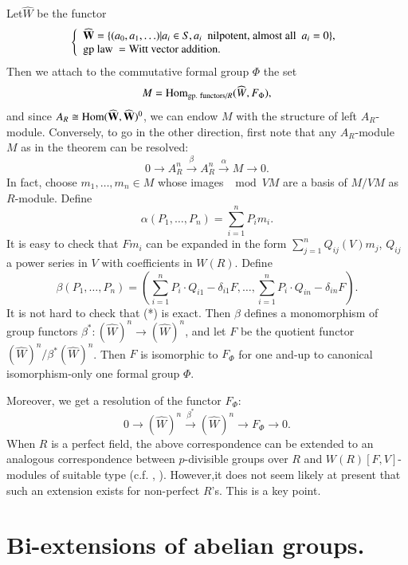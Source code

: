 Let\pageoriginale $\widehat{W}$ be the functor
$$
\left\{
\begin{array}{l}
\widehat{\mathbf{W}}=\{(a_{0},a_{1},\ldots)|a_{i}\in S, a_{i}\text{~ nilpotent, almost all~ } a_{i}=0\},\\
\text{gp law } = \text{Witt vector addition.}
\end{array}\right.
$$
Then we attach to the commutative formal group $\Phi$ the set
$$
M=\operatorname{\mathrm{Hom}}_{\text{gp. functors/}R}(\widehat{W},F_{\Phi}),
$$
and since $A_{R}\cong \operatorname{\mathrm{Hom}} (\widehat{\mathbf{W}},\widehat{\mathbf{W}})^{0}$, we can endow $M$ with the structure of left $A_{R}$-module. Conversely, to go in the other direction, first note that any $A_{R}$-module $M$ as in the theorem can be resolved:
\begin{equation*}
0\to A^{n}_{R}\xrightarrow{\beta}A^{n}_{R}\xrightarrow{\alpha}M\to 0.\tag{*}
\end{equation*}
In fact, choose $m_{1},\ldots,m_{n}\in M$ whose images $\mod VM$ are a basis of $M/VM$ as $R$-module. Define
$$
\alpha(P_{1},\ldots,P_{n})=\sum\limits^{n}_{i=1}P_{i}m_{i}.
$$
It is easy to check that $Fm_{i}$ can be expanded in the form $\sum\limits^{n}_{j=1}Q_{ij}(V)m_{j}$, $Q_{ij}$ a power series in $V$ with coefficients in $W(R)$. Define
$$
\beta(P_{1},\ldots,P_{n})=\left(\sum\limits^{n}_{i=1}P_{i}\cdot Q_{i1}-\delta_{i1}F,\ldots,\sum\limits^{n}_{i=1}P_{i}\cdot Q_{in}-\delta_{in}F\right).
$$
It is not hard to check that (*) is exact. Then $\beta$ defines a monomorphism of group functors $\beta^{*}:(\widehat{W})^{n}\to (\widehat{W})^{n}$, and let $F$ be the quotient functor $(\widehat{W})^{n}/\beta^{*}(\widehat{W})^{n}$. Then $F$ is isomorphic to $F_{\Phi}$ for one and-up to canonical isomorphism-only one formal group $\Phi$.

Moreover, we get a resolution of the functor $F_{\Phi}$:
$$
0\to (\widehat{W})^{n}\xrightarrow{\beta^{*}}(\widehat{W})^{n}\to F_{\Phi}\to 0.
$$
When $R$ is a perfect field, the above correspondence can be extended to an analogous correspondence between $p$-divisible groups over $R$ and $W(R)[F,V]$-modules of suitable type (c.f. \cite{art15-key4}, \cite{art15-key5}). However,\pageoriginale it does not seem likely at present that such an extension exists for non-perfect $R$'s. This is a key point.

\section{Bi-extensions of abelian groups.}\label{art15-sec2}

